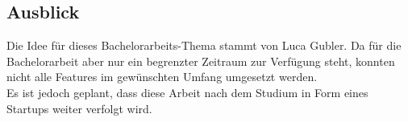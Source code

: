 \subsection{Ausblick}
Die Idee für dieses Bachelorarbeits-Thema stammt von Luca Gubler. Da für die Bachelorarbeit aber nur ein begrenzter Zeitraum zur Verfügung steht, konnten nicht alle Features im gewünschten Umfang umgesetzt werden. \\

Es ist jedoch geplant, dass diese Arbeit nach dem Studium in Form eines Startups weiter verfolgt wird.


\newpage